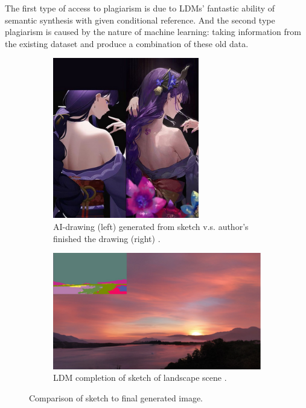 The first type of access to plagiarism is due to LDMs' fantastic ability of semantic 
synthesis with given conditional reference.
And the second type plagiarism is caused by the nature of machine learning:
taking information from the existing dataset and produce a combination of these old data.
\begin{figure}[h]
     \centering
     \begin{subfigure}[b]{0.49\textwidth}
         \centering
         \includegraphics[width=0.7\textwidth]{img/LDM-2.png}
         \caption{
            AI-drawing (left) generated from sketch v.s. 
            author's finished the drawing (right) \cite{Sahbegovic2022anime}.
        }
     \end{subfigure}
     \hfill
     \begin{subfigure}[b]{0.49\textwidth}
         \centering
         \includegraphics[width=\textwidth]{img/LDM-3.png}
         \caption{LDM completion of sketch of landscape scene \cite{Rombach2022High}.}
     \end{subfigure}
     \hfill
     \caption{Comparison of sketch to final generated image.}
\end{figure}
